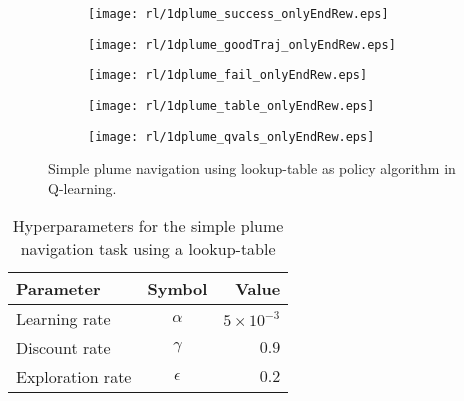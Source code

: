 \documentclass[../dissertation.tex]{subfiles}
\begin{document}
\begin{figure}[p]
    \centering
    \begin{subfigure}[b]{0.7\textwidth}
        \texttt{[image: rl/1dplume\_success\_onlyEndRew.eps]}
        \label{fig:1dOnlyEndRew_success}
    \end{subfigure}
    
    \par\bigskip

    \begin{subfigure}[b]{0.4\textwidth}
        \texttt{[image: rl/1dplume\_goodTraj\_onlyEndRew.eps]}
        \label{fig:1dOnlyEndRew_win}
    \end{subfigure}
    \hfill
    \begin{subfigure}[b]{0.4\textwidth}
        \texttt{[image: rl/1dplume\_fail\_onlyEndRew.eps]}
        \label{fig:1dOnlyEndRew_lose}
    \end{subfigure}
    
    \par\bigskip
    
    \begin{subfigure}[h]{0.3\textwidth}
        \texttt{[image: rl/1dplume\_table\_onlyEndRew.eps]}
        \label{fig:1dOnlyEndRew_table}
    \end{subfigure}
    \hfill
    \begin{subfigure}[h]{0.4\textwidth}
        \texttt{[image: rl/1dplume\_qvals\_onlyEndRew.eps]}
        \label{fig:1dOnlyEndRew_qcomp}
    \end{subfigure}
    
    \caption{Simple plume navigation using lookup-table as policy algorithm in Q-learning.}
    \label{fig:1dOnlyEndRew}
\end{figure}

\begin{table}
    \centering
    \begin{tabular}{lcr}
        \toprule
        Parameter           & Symbol        &   Value               \\
        \midrule
        Learning rate       & $\alpha$      & $5 \times 10^{-3}$    \\
        Discount rate       & $\gamma$      & $0.9$                 \\
        Exploration rate    & $\epsilon$    & $0.2$                 \\
        \bottomrule
    \end{tabular}
    \caption{Hyperparameters for the simple plume navigation task using a lookup-table}
    \label{tab:1dOnlyEndRew_hyperp}
\end{table}
\end{document}
